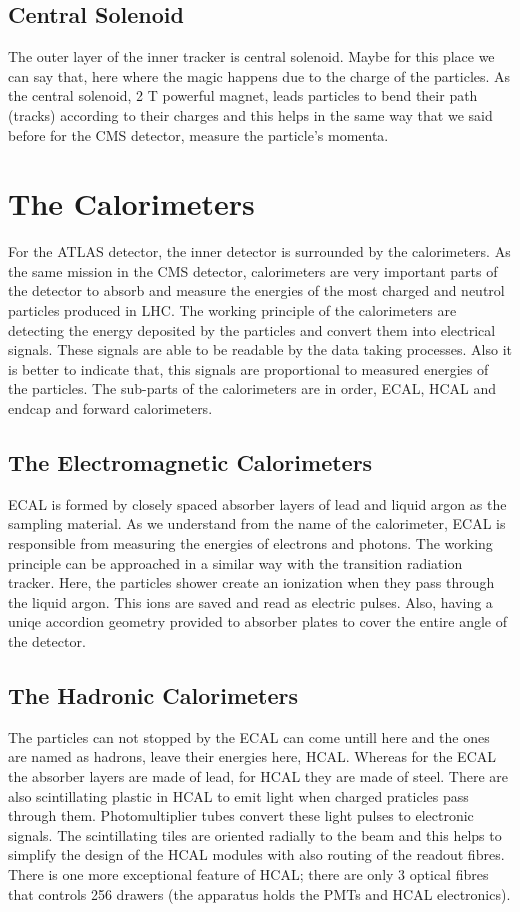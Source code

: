 \documentclass[a4paper,9pt]{article}
\begin{document}
\subsection{Central Solenoid}
The outer layer of the inner tracker is central solenoid. Maybe for this place we can say that, here where the magic happens due to the
charge of the particles. As the central solenoid, 2 T powerful magnet, leads particles to bend their path (tracks) according to their
charges and this helps in the same way that we said before for the CMS detector, measure the particle's momenta.

\section{The Calorimeters}

For the ATLAS detector, the inner detector is surrounded by the calorimeters.
As the same mission in the CMS detector, calorimeters are very important
parts of the detector to absorb and measure the energies of the most
charged and neutrol particles produced in LHC. The working principle 
of the calorimeters are detecting the energy deposited by the particles 
and convert them into electrical signals. These signals are able to be readable
by the data taking processes. Also it is better to indicate that, this
signals are proportional to measured energies of the particles.
The sub-parts of the calorimeters are in order, ECAL, HCAL and
endcap and forward calorimeters.

\subsection{The Electromagnetic Calorimeters}
ECAL is formed by closely spaced absorber layers of lead and liquid 
argon as the sampling material. As we understand from the name of the
calorimeter, ECAL is responsible from measuring the energies of electrons
and photons. The working principle can be approached in a similar
way with the transition radiation tracker. Here, the particles shower create
an ionization when they pass through the liquid argon. This ions are saved and read as
electric pulses. Also, having a uniqe accordion geometry provided to
absorber plates to cover the entire angle of the detector.

\subsection{The Hadronic Calorimeters}
The particles can not stopped by the ECAL can come untill here and
the ones are named as hadrons, leave their energies here, HCAL.
Whereas for the ECAL the absorber layers are made of lead, for HCAL they are
made of steel. There are also scintillating plastic in HCAL to emit light when
charged praticles pass through them. Photomultiplier tubes convert these
light pulses to electronic signals. The scintillating tiles are oriented
radially to the beam and this helps to simplify the design of the HCAL
modules with also routing of the readout fibres. There is one more exceptional
feature of HCAL; there are only 3 optical fibres that controls 256 drawers
(the apparatus holds the PMTs and HCAL electronics).
\end{document}
